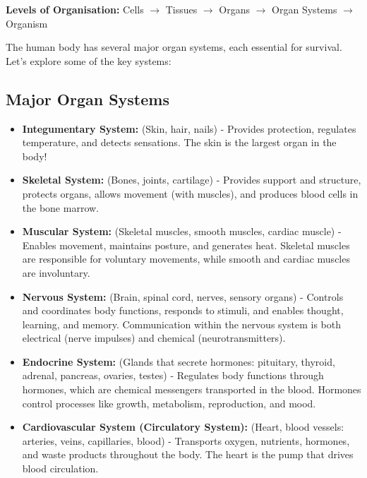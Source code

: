 \begin{marginnote}
\textbf{Levels of Organisation:}
Cells $\rightarrow$ Tissues $\rightarrow$ Organs $\rightarrow$ Organ Systems $\rightarrow$ Organism
\end{marginnote}

The human body has several major organ systems, each essential for survival.  Let's explore some of the key systems:

\subsection{Major Organ Systems}

\begin{itemize}
    \item \textbf{Integumentary System:} (Skin, hair, nails) - Provides protection, regulates temperature, and detects sensations.  The skin is the largest organ in the body!

    \item \textbf{Skeletal System:} (Bones, joints, cartilage) - Provides support and structure, protects organs, allows movement (with muscles), and produces blood cells in the bone marrow.  

    \item \textbf{Muscular System:} (Skeletal muscles, smooth muscles, cardiac muscle) - Enables movement, maintains posture, and generates heat. Skeletal muscles are responsible for voluntary movements, while smooth and cardiac muscles are involuntary.

    \item \textbf{Nervous System:} (Brain, spinal cord, nerves, sensory organs) -  Controls and coordinates body functions, responds to stimuli, and enables thought, learning, and memory. Communication within the nervous system is both electrical (nerve impulses) and chemical (neurotransmitters).

    \item \textbf{Endocrine System:} (Glands that secrete hormones: pituitary, thyroid, adrenal, pancreas, ovaries, testes) - Regulates body functions through hormones, which are chemical messengers transported in the blood. Hormones control processes like growth, metabolism, reproduction, and mood.

    \item \textbf{Cardiovascular System (Circulatory System):} (Heart, blood vessels: arteries, veins, capillaries, blood) - Transports oxygen, nutrients, hormones, and waste products throughout the body. The heart is the pump that drives blood circulation.


\end{itemize}
